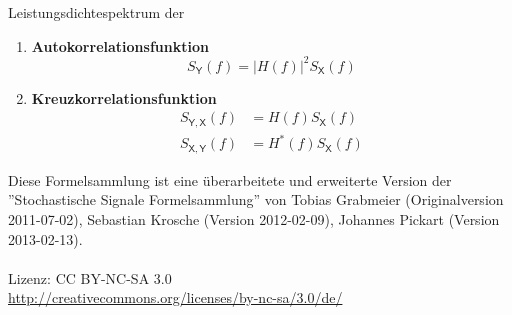 \documentclass[a4paper,twocolumn,10pt]{article}
\newenvironment{iii}{\begin{enumerate}[label={\roman{*})}]}{\end{enumerate}}
\begin{document}
Leistungsdichtespektrum der
\begin{iii}
\item \textbf{Autokorrelationsfunktion}
\[ S_{\mathsf{Y}}(f) = |H(f)|^{2} S_{\mathsf{X}}(f)\]
\item \textbf{Kreuzkorrelationsfunktion}
\begin{align}
S_{\mathsf{Y,X}}(f) & = H(f) S_{\mathsf{X}}(f) \nonumber \\
S_{\mathsf{X,Y}}(f) & = H^{*}(f) S_{\mathsf{X}}(f) \nonumber 
\end{align}
\end{iii}
\vspace{1cm}
Diese Formelsammlung ist eine überarbeitete und erweiterte Version der ''Stochastische Signale Formelsammlung'' von Tobias Grabmeier (Originalversion 2011-07-02), Sebastian Krosche (Version 2012-02-09), Johannes Pickart (Version 2013-02-13).\\\\
Lizenz: CC BY-NC-SA 3.0\\
\url{http://creativecommons.org/licenses/by-nc-sa/3.0/de/}
\end{document}
